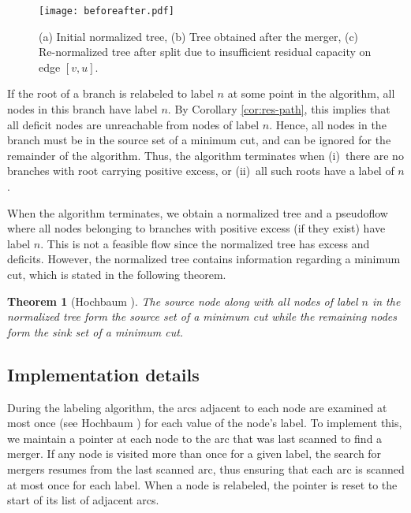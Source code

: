 \documentclass{article}
\newtheorem{theorem}{Theorem}[section]
\begin{document}
\begin{figure}
\centerline{\texttt{[image: beforeafter.pdf]}}
\vspace{0.1in}
\caption{\label{Figure:beforeafter} (a) Initial normalized tree, (b) Tree obtained after the merger, (c) Re-normalized tree after split due to insufficient residual capacity on edge $[v,u]$.}
\end{figure}

If the root of a branch is relabeled to label $n$ at some point in the algorithm, all nodes in this branch have label $n$. By Corollary \ref{cor:res-path}, this implies that all deficit nodes are unreachable from nodes of label $n$. Hence, all nodes in the branch must be in the source set of a minimum cut, and can be ignored for the remainder of the algorithm. Thus, the algorithm terminates when (i)~there are no branches with root carrying positive excess, or (ii)~all such roots have a label of $n$.

When the algorithm terminates, we obtain a normalized tree and a pseudoflow where all nodes belonging to branches with positive excess (if they exist) have label $n$. This is not a feasible flow since the normalized tree has excess and deficits. However, the normalized tree contains information regarding a minimum cut, which is stated in the following theorem.

\begin{theorem}[Hochbaum \cite{Hoc97, Hoc07}]
The source node along with all nodes of label $n$ in the normalized tree form the source set of a minimum cut while the remaining nodes form the sink set of a minimum cut.
\end{theorem}

\subsection{Implementation details}

 During the labeling algorithm, the arcs adjacent to each node are examined at most once (see Hochbaum \cite{Hoc97, Hoc07}) for each value of the node's label.  To implement this, we maintain a pointer at each node to the arc that was last scanned to find a merger. If any node is visited more than once for a given label, the search for mergers resumes from the last scanned arc, thus ensuring that each arc is scanned at most once for each label. When a node is relabeled, the pointer is reset to the start of its list of adjacent arcs.
\end{document}
